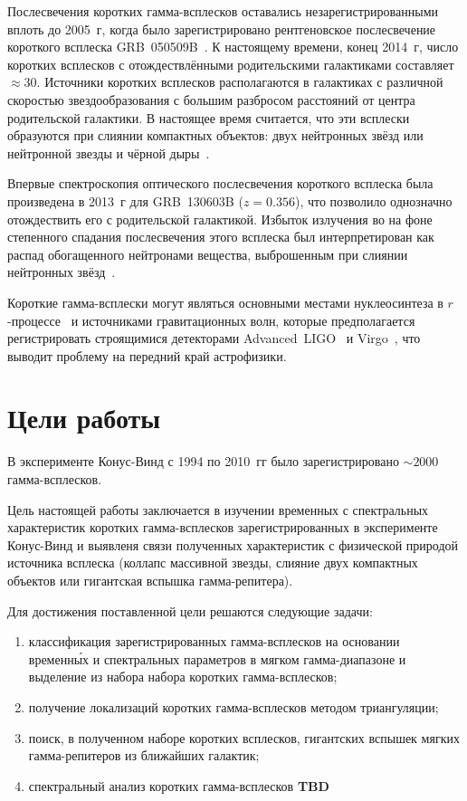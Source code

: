 Послесвечения коротких гамма-всплесков оставались незарегистрированными вплоть 
до 2005~г, когда было зарегистрировано рентгеновское послесвечение короткого 
всплеска GRB~050509B~\citep{Gehrels_2005Natur}. К настоящему времени, конец 2014~г, 
число коротких всплесков с отождествлёнными родительскими галактиками составляет $\approx 30$. 
Источники коротких всплесков располагаются в галактиках с различной скоростью 
звездообразования с большим разбросом расстояний от центра родительской галактики. 
В настоящее время считается, что эти всплески образуются при слиянии компактных 
объектов: двух нейтронных звёзд или нейтронной звезды и чёрной дыры~\citep[см. обзор][]{Berger_2014ARAA}.

Впервые спектроскопия оптического послесвечения короткого всплеска была произведена в 2013~г 
для GRB~130603B ($z = 0.356$), что позволило однозначно отождествить его с 
родительской галактикой. Избыток излучения во на фоне степенного спадания 
послесвечения этого всплеска был интерпретирован как распад обогащенного 
нейтронами вещества, выброшенным при слиянии нейтронных звёзд~\citep{Tanvir_2013Natur}. 

Короткие гамма-всплески могут являться основными местами нуклеосинтеза в 
$r$-процессе~\citep{Tanvir_2013Natur} и источниками гравитационных волн, 
которые предполагается регистрировать строящимися детекторами Advanced~LIGO~\citep{Harry_2010CQGra} 
и Virgo~\citep{Accadia_2012JInst}, что выводит проблему на передний край астрофизики.

\section{Цели работы}
В эксперименте Конус-Винд с 1994 по 2010~гг было зарегистрировано $\sim 2000$ гамма-всплесков. 

Цель настоящей работы заключается в изучении временных с спектральных характеристик 
коротких гамма-всплесков зарегистрированных в эксперименте Конус-Винд и выявленя 
связи полученных характеристик с физической природой источника всплеска 
(коллапс массивной звезды, слияние двух компактных объектов или гигантская вспышка гамма-репитера).

Для достижения поставленной цели решаются следующие задачи:
\begin{enumerate}
\item классификация зарегистрированных гамма-всплесков на основании временн\'{ы}х 
и спектральных параметров в мягком гамма-диапазоне и выделение из набора набора коротких гамма-всплесков; 
\item получение локализаций коротких гамма-всплесков методом триангуляции; 
\item поиск, в полученном наборе коротких всплесков, гигантских 
вспышек мягких гамма-репитеров из ближайших галактик;
\item спектральный анализ коротких гамма-всплесков \textbf{TBD}
\end{enumerate}

